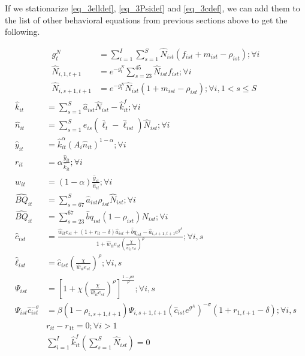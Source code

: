 \documentclass[letterpaper,12pt]{article}
\theoremstyle{definition}
\numberwithin{equation}{section}
\begin{document}
\begin{spacing}{1.5}
	If we stationarize \eqref{eq_3elldef}, \eqref{eq_3Psidef} and \eqref{eq_3cdef}, we can add them to the list of other behavioral equations from previous sections above to get the following.

	\begin{align}
		g^N_t & = \sum_{i=1}^I \sum_{s=1}^S \hat N_{ist} (f_{ist}+m_{ist}-\rho_{ist}) ; \forall i \label{eq_3gNdef}\\
		\hat N_{i,1,t+1} & = e^{-g^N_t}\sum_{s=23}^{45} \hat N_{ist} f_{ist} ; \forall i\\
		\hat N_{i,s+1,t+1} & = e^{-g^N_t}\hat N_{ist} (1+m_{ist}-\rho_{ist}); \forall i, 1<s\le S \label{eq_3pop2}
	\end{align}
	\begin{align}
		\hat k_{it} & = \sum_{s=1}^S \hat a_{ist} \hat N_{ist} - \hat k_{it}^f; \forall i \label{eq_3kdef}\\
		\hat n_{it} & = \sum_{s=1}^S e_{is} (\bar \ell_t - \hat \ell_{ist}) \hat N_{ist}; \forall i \label{eq_3cond2} \\
		\hat y_{it} & = \hat k_{it}^\alpha \left( A_{i} \hat n_{it} \right)^{1-\alpha} ; \forall i \\
		r_{it} & = \alpha \frac{\hat y_{it}}{\hat k_{it}}; \forall i \label{eq_3rdef} \\
		\hat w_{it} & = (1-\alpha) \frac{\hat y_{it}}{\hat n_{it}}; \forall i \label{eq_3wdef}\\
		\hat {BQ}_{it} & = \sum_{s=67}^S \hat a_{ist} \rho_{ist} \hat N_{ist} ; \forall i \label{eq_3BQ1}\\
		\hat {BQ}_{it} & = \sum_{s=23}^{67} \hat bq_{ist} (1-\rho_{ist}) \hat N_{ist}	; \forall i \label{eq_3BQ2}\\
    	\hat c_{ist} & = \frac{\hat w_{it} e_{st} + (1+r_{it}-\delta)\hat a_{ist} + {\hat bq}_{ist} - \hat a_{i,s+1,t+1}e^{g^A}} {1 + \hat w_{it} e_{st} \left(\frac{\chi} {\hat w_{it} e_{st}}\right)^{\rho}}; \forall i,s \label{eq_3cdef2} \\
		\hat \ell_{ist} & = \hat c_{ist} \left(\frac{\chi}{\hat w_{it}e_{st}}\right)^\rho ; \forall i,s \label{eq3_elldef}\\
		\Psi_{ist} & = \left[1 + \chi \left(\frac{\chi} {\hat w_{it} e_{st}}\right)^{\rho} \right]^{\frac{1-\rho \sigma}{\rho}}; \forall i,s \label{eq_3Psidef2} \\
		\Psi_{ist} \hat c_{ist}^{-\sigma} & = \beta (1-\rho_{i,s+1,t+1}) \Psi_{i,s+1,t+1} \left(\hat c_{ist}e^{g^A}\right)^{-\sigma}(1+r_{1,t+1}-\delta); \forall i,s \label{eq_3Euler2} \\
		& r_{it} - r_{1t} = 0; \forall i>1 \label{eq_3requal}\\
		& \sum_{i=1}^I \hat k^f_{it} \left( \sum_{s=1}^S \hat N_{ist} \right) = 0 \label{eq_3cond3}
	\end{align}


\end{spacing}
\end{document}
